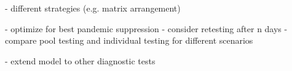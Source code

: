 \documentclass[fleqn,10pt]{wlscirep}
\begin{document}
- different strategies (e.g. matrix arrangement)

- optimize for best pandemic suppression
	- consider retesting after n days
	- compare pool testing and individual testing for different scenarios 
	
- extend model to other diagnostic tests










\end{document}
